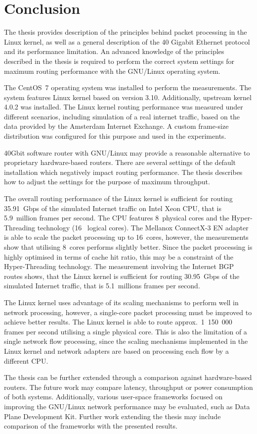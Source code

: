 
\chapter{Conclusion}\label{chap:conclusion}
The thesis provides description of the principles behind packet processing in the Linux kernel, as well as
a general description of the 40 Gigabit Ethernet protocol and its performance limitation.
An advanced knowledge of the principles described in the thesis is required to
perform the correct system settings for maximum routing performance with the GNU/Linux operating system.

The CentOS~7 operating system was installed to perform the measurements.
The system features Linux kernel based on version 3.10.
Additionally, upstream kernel 4.0.2 was installed.
The Linux kernel routing performance was measured under different scenarios, including
simulation of a real internet traffic, based on the data provided by the Amsterdam Internet Exchange.
A custom frame-size distribution was configured for this purpose and used in the experiments.

40Gbit software router with GNU/Linux may provide a reasonable alternative to proprietary hardware-based routers.
There are several settings of the default installation which negatively impact routing performance.
The thesis describes how to adjust the settings for the purpose of maximum throughput.

The overall routing performance of the Linux kernel is sufficient for routing 35.91~Gbps
of the simulated Internet traffic on Intel Xeon CPU, that is 5.9~million frames per second.
The CPU features 8~physical cores and the Hyper-Threading technology (16~ logical cores).
The Mellanox ConnectX-3 EN adapter is able to scale the packet processing up to 16~cores,
however, the measurements show that utilising 8~cores performs slightly better.
Since the packet processing is highly optimised in terms of cache hit ratio,
this may be a constraint of the Hyper-Threading technology.
The measurement involving the Internet BGP routes shows,
that the Linux kernel is sufficient for routing 30.95~Gbps of the simulated Internet traffic,
that is 5.1~millions frames per second.

The Linux kernel uses advantage of its scaling mechanisms to perform well in network processing,
however, a single-core packet processing must be improved to achieve better results.
The Linux kernel is able to route approx.~1~150~000
frames per second utilising a single physical core.
This is also the limitation of a single network flow processing,
since the scaling mechanisms implemented in the Linux kernel and network adapters
are based on processing each flow by a different CPU.

The thesis can be further extended through a comparison against hardware-based routers.
The future work may compare latency, throughput or power consumption of both systems.
Additionally, various user-space frameworks focused on improving the GNU/Linux network performance may be evaluated,
such as Data Plane Development Kit.
Further work extending the thesis may include comparison of
the frameworks with the presented results.
